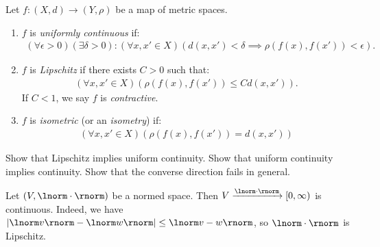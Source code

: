     \begin{definition}
        Let $f:(X,d) \rightarrow (Y,\rho)$ be a map of metric spaces.
        \begin{enumerate}[label = (\arabic*),itemsep=1pt,topsep=3pt]
            \item $f$ is \textit{uniformly continuous} if:
                \begin{equation*}
                \begin{split}
                    (\forall \epsilon > 0)(\exists \delta > 0): (\forall x,x' \in X)(d(x,x') < \delta \implies \rho(f(x),f(x')) < \epsilon).
                \end{split}
                \end{equation*}
            \item $f$ is \textit{Lipschitz} if there exists $C > 0$ such that:
                \begin{equation*}
                \begin{split}
                    (\forall x,x' \in X)(\rho(f(x),f(x')) \leq C d(x,x')).
                \end{split}
                \end{equation*}
            If $C < 1$, we say $f$ is \textit{contractive}.

            \item $f$ is \textit{isometric} (or an \textit{isometry}) if:
                \begin{equation*}
                \begin{split}
                    (\forall x,x' \in X)(\rho(f(x),f(x')) = d(x,x'))
                \end{split}
                \end{equation*}
        \end{enumerate}
    \end{definition}

    \begin{exercise}
        Show that Lipschitz implies uniform continuity. Show that uniform continuity implies continuity. Show that the converse direction fails in general.
    \end{exercise}

    \begin{example}
        Let $(V, \lnorm \cdot \rnorm)$ be a normed space. Then $V \xrightarrow{\lnorm \cdot \rnorm} [0,\infty)$ is continuous. Indeed, we have $\left| \lnorm v \rnorm - \lnorm w \rnorm \right| \leq \lnorm v - w \rnorm$, so $\lnorm \cdot \rnorm$ is Lipschitz.
    \end{example}

